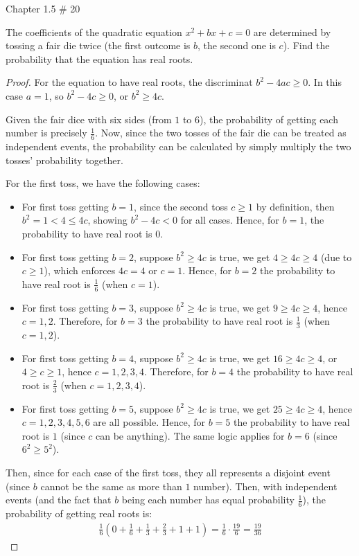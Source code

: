 \documentclass{article}
\begin{document}
\newpage


\begin{ques}\label{q6}
    Chapter 1.5 \# 20

    The coefficients of the quadratic equation $x^2+bx+c=0$ are determined by tossing a fair die twice (the first outcome is $b$, the second one is $c$). Find the probability that the equation has real roots.
\end{ques}

\begin{proof}
    For the equation to have real roots, the discriminat $b^2 - 4ac\geq 0$. In this case $a=1$, so $b^2-4c\geq 0$, or $b^2\geq 4c$.

    Given the fair dice with six sides (from $1$ to $6$), the probability of getting each number is precisely $\frac{1}{6}$. Now, since the two tosses of the fair die can be treated as independent events, the probability can be calculated by simply multiply the two tosses' probability together. 
    
    For the first toss, we have the following cases:
    \begin{itemize}
        \item For first toss getting $b=1$, since the second toss $c\geq 1$ by definition, then $b^2 = 1<4 \leq 4c$, showing $b^2-4c<0$ for all cases. Hence, for $b=1$, the probability to have real root is $0$.
        \item For first toss getting $b=2$, suppose $b^2 \geq 4c$ is true, we get $4 \geq 4c \geq 4$ (due to $c\geq 1$), which enforces $4c=4$ or $c=1$. Hence, for $b=2$ the probability to have real root is $\frac{1}{6}$ (when $c=1$).
        \item For first toss getting $b=3$, suppose $b^2\geq 4c$ is true, we get $9\geq 4c\geq 4$, hence $c=1,2$. Therefore, for $b=3$ the probability to have real root is $\frac{1}{3}$ (when $c=1,2$).
        \item For first toss getting $b=4$, suppose $b^2\geq 4c$ is true, we get $16 \geq 4c \geq 4$, or $4\geq c\geq 1$, hence $c=1,2,3,4$. Therefore, for $b=4$ the probability to have real root is $\frac{2}{3}$ (when $c=1,2,3,4$).
        \item For first toss getting $b=5$, suppose $b^2\geq 4c$ is true, we get $25\geq 4c\geq 4$, hence $c=1,2,3,4,5,6$ are all possible. Hence, for $b=5$ the probability to have real root is $1$ (since $c$ can be anything). The same logic applies for $b=6$ (since $6^2 \geq 5^2$).
    \end{itemize}

    Then, since for each case of the first toss, they all represents a disjoint event (since $b$ cannot be the same as more than $1$ number). Then, with independent events (and the fact that $b$ being each number has equal probability $\frac{1}{6}$), the probability of getting real roots is:
    \begin{align}
        \frac{1}{6}\left(0+\frac{1}{6}+\frac{1}{3}+\frac{2}{3}+1+1\right) = \frac{1}{6}\cdot \frac{19}{6}=\frac{19}{36}
    \end{align}
\end{proof}
\end{document}
